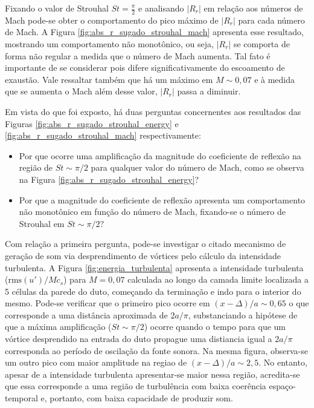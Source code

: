 Fixando o valor de Strouhal $St = \frac{\pi}{2}$ e analisando $|R_{r}|$ em relação aos números de Mach pode-se obter o comportamento do pico máximo de $|R_{r}|$ para cada número de Mach. A Figura \ref{fig:abs_r_sugado_strouhal_mach} apresenta esse resultado, mostrando um comportamento não monotônico, ou seja, $|R_{r}|$ se comporta de forma não regular a medida que o número de Mach aumenta. Tal fato é importante de se considerar pois difere significativamente do escoamento de exaustão. Vale ressaltar também que há um máximo em $M \sim 0,07$ e à medida que se aumenta o Mach além desse valor, $|R_{r}|$ passa a diminuir.

\begin{figure}[ht!]
\centering
  
\end{figure}

\begin{figure}[ht!]
\centering
  
\end{figure}

\newpage
Em vista do que foi exposto, há duas perguntas concernentes aos resultados das Figuras \ref{fig:abs_r_sugado_strouhal_energy} e \ref{fig:abs_r_sugado_strouhal_mach} respectivamente:

\begin{itemize}
  \item Por que ocorre uma amplificação da magnitude do coeficiente de reflexão na região de $St \sim \pi/2$ para qualquer valor do número de Mach, como se observa na Figura \ref{fig:abs_r_sugado_strouhal_energy}?

  \item Por que a magnitude do coeficiente de reflexão apresenta um comportamento não monotônico em função do número de Mach, fixando-se o número de Strouhal em $St \sim \pi/2$?
\end{itemize}

\begin{figure}[ht!]
\centering
  
\end{figure}

Com relação a primeira pergunta, pode-se investigar o citado mecanismo de geração de som via desprendimento de vórtices pelo cálculo da intensidade turbulenta. A Figura \ref{fig:energia_turbulenta} apresenta a intensidade turbulenta ($\text{rms}(u')/Mc_{s}$) para $M = 0,07$ calculada ao longo da camada limite localizada a 5 células da parede do duto, começando da terminação e indo para o interior do mesmo. Pode-se verificar que o primeiro pico ocorre em $(x - \Delta)/a \sim 0,65$ o que corresponde a uma distância aproximada de $2a/\pi$, substanciando a hipótese de que a máxima amplificação ($St \sim \pi/2$) ocorre quando o tempo para que um vórtice desprendido na entrada do duto propague uma distiancia igual a $2a/\pi$ corresponda ao período de oscilação da fonte sonora. Na mesma figura, observa-se um outro pico com maior amplitude na regiao de $(x - \Delta)/a \sim 2,5$. No entanto, apesar de a intensidade turbulenta apresentar-se maior nessa região, acredita-se que essa corresponde a uma região de turbulência com baixa coerência espaço-temporal e, portanto, com baixa capacidade de produzir som.


